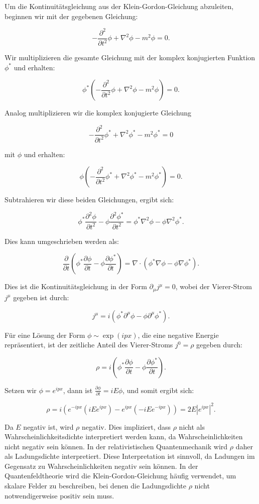 Um die Kontinuitätsgleichung aus der Klein-Gordon-Gleichung abzuleiten, beginnen wir mit der gegebenen Gleichung:

\[
-\frac{\partial^2}{\partial t^2} \phi + \nabla^2 \phi - m^2 \phi = 0.
\]

Wir multiplizieren die gesamte Gleichung mit der komplex konjugierten Funktion \(\phi^*\) und erhalten:

\[
\phi^* \left(-\frac{\partial^2}{\partial t^2} \phi + \nabla^2 \phi - m^2 \phi \right) = 0.
\]

Analog multiplizieren wir die komplex konjugierte Gleichung

\[
-\frac{\partial^2}{\partial t^2} \phi^* + \nabla^2 \phi^* - m^2 \phi^* = 0
\]

mit \(\phi\) und erhalten:

\[
\phi \left(-\frac{\partial^2}{\partial t^2} \phi^* + \nabla^2 \phi^* - m^2 \phi^* \right) = 0.
\]

Subtrahieren wir diese beiden Gleichungen, ergibt sich:

\[
\phi^* \frac{\partial^2 \phi}{\partial t^2} - \phi \frac{\partial^2 \phi^*}{\partial t^2} = \phi^* \nabla^2 \phi - \phi \nabla^2 \phi^*.
\]

Dies kann umgeschrieben werden als:

\[
\frac{\partial}{\partial t} \left(\phi^* \frac{\partial \phi}{\partial t} - \phi \frac{\partial \phi^*}{\partial t}\right) = \nabla \cdot \left(\phi^* \nabla \phi - \phi \nabla \phi^*\right).
\]

Dies ist die Kontinuitätsgleichung in der Form \(\partial_\mu j^\mu = 0\), wobei der Vierer-Strom \(j^\mu\) gegeben ist durch:

\[
j^\mu = i\left(\phi^* \partial^\mu \phi - \phi \partial^\mu \phi^*\right).
\]

Für eine Lösung der Form \(\phi \sim \exp(i p x)\), die eine negative Energie repräsentiert, ist der zeitliche Anteil des Vierer-Stroms \(j^0 = \rho\) gegeben durch:

\[
\rho = i\left(\phi^* \frac{\partial \phi}{\partial t} - \phi \frac{\partial \phi^*}{\partial t}\right).
\]

Setzen wir \(\phi = e^{i p x}\), dann ist \(\frac{\partial \phi}{\partial t} = i E \phi\), und somit ergibt sich:

\[
\rho = i\left(e^{-i p x} (i E e^{i p x}) - e^{i p x} (-i E e^{-i p x})\right) = 2 E |e^{i p x}|^2.
\]

Da \(E\) negativ ist, wird \(\rho\) negativ. Dies impliziert, dass \(\rho\) nicht als Wahrscheinlichkeitsdichte interpretiert werden kann, da Wahrscheinlichkeiten nicht negativ sein können. In der relativistischen Quantenmechanik wird \(\rho\) daher als Ladungsdichte interpretiert. Diese Interpretation ist sinnvoll, da Ladungen im Gegensatz zu Wahrscheinlichkeiten negativ sein können. In der Quantenfeldtheorie wird die Klein-Gordon-Gleichung häufig verwendet, um skalare Felder zu beschreiben, bei denen die Ladungsdichte \(\rho\) nicht notwendigerweise positiv sein muss.